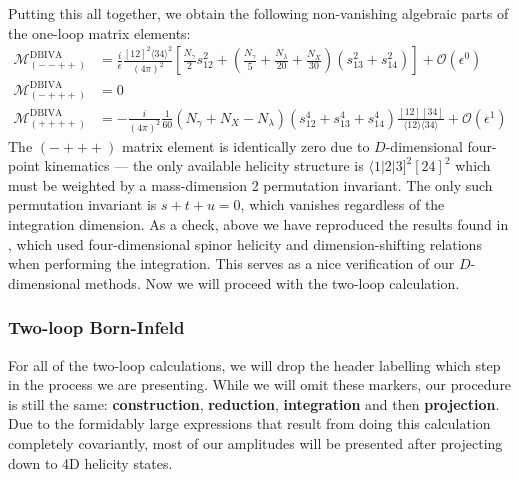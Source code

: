 \documentclass[11pt,letter]{article}
\begin{document}
Putting this all together, we obtain the following non-vanishing algebraic parts of the one-loop matrix elements:
\begin{align}
\mathcal{M}^{\text{DBIVA}} _{(--++)}&=\frac{i}{\epsilon} \frac{[12]^2\langle34\rangle^2}{(4\pi)^2}\left[\frac{N_\gamma}{2}s_{12}^2+\left(\frac{N_\gamma}{5}+\frac{N_\lambda}{20}+\frac{N_X}{30}\right)(s_{13}^2+s_{14}^2)\right]+\mathcal{O}(\epsilon^0)
\\
\mathcal{M}^{\text{DBIVA}}_{(-+++)}&= 0
\\
\mathcal{M}^{\text{DBIVA}}_{(++++)}&= -\frac{i}{(4\pi)^2}\frac{1}{60}\left(N_\gamma+N_X-N_\lambda\right) (s_{12}^4+s_{13}^4+s_{14}^4)\frac{[12][34]}{\langle12\rangle\langle 34\rangle}+\mathcal{O}(\epsilon^1) \label{eq:generalDBI1loop}
\end{align}
The $(-+++)$ matrix element is identically zero due to $D$-dimensional four-point kinematics --- the only available helicity structure is $\langle 1|2|3]^2[24]^2$ which must be weighted by a mass-dimension 2 permutation invariant. The only such permutation invariant is $s+t+u =0$, which vanishes regardless of the integration dimension. As a check, above we have reproduced the results found in \cite{Elvang:2020kuj}, which used four-dimensional spinor helicity and dimension-shifting relations when performing the integration. This serves as a nice verification of our $D$-dimensional methods. Now we will proceed with the two-loop calculation. 
\subsubsection{Two-loop Born-Infeld}\label{sec:2loopBIU}
For all of the two-loop calculations, we will drop the header labelling which step in the process we are presenting. While we will omit these markers, our procedure is still the same: \textbf{construction}, \textbf{reduction}, \textbf{integration} and then \textbf{projection}. Due to the formidably large expressions that result from doing this calculation completely covariantly, most of our amplitudes will be presented {after} projecting down to 4D helicity states. 
\end{document}
